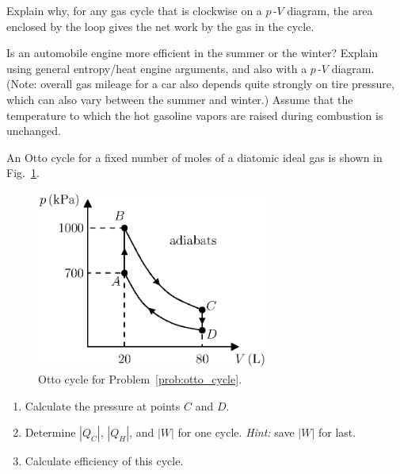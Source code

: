 \begin{problem} 
  Explain why, for any gas cycle that is clockwise on a $p$\,-$V$
  diagram, the area enclosed by the loop gives the net work by the gas
  in the cycle.
\end{problem}

\begin{problem} 
  Is an automobile engine more efficient in the summer or the 
  winter?
  Explain using general entropy/heat engine arguments, and also with a
  $p$\,-$V$ diagram. (Note:  overall gas mileage for a car also depends
  quite strongly on tire pressure, which can also vary between the summer
  and winter.)  Assume that the temperature to which the hot gasoline vapors
are raised during  combustion  is unchanged.
\end{problem}

\begin{problem} 
  An Otto cycle for a fixed number of moles of a diatomic ideal gas is shown in
  Fig.~\ref{fig:otto_cycle_hw}. 
  \begin{figure}[h]
    \begin{center}
      \includegraphics[width=3in]{heat_engines/otto_cycle_hw.eps}
      \caption{Otto cycle for Problem~\ref{prob:otto_cycle}.}
      \label{fig:otto_cycle_hw}
    \end{center}
  \end{figure}
   \begin{enumerate}
   \item Calculate the pressure at points $C$ and $D$.
   \item Determine $|Q_C|$, $|Q_H|$, and $|W|$ for one cycle.  {\it
       Hint:} save $|W|$ for last.
   \item Calculate efficiency of this cycle. 
   \end{enumerate}
   \label{prob:otto_cycle}
\end{problem}


